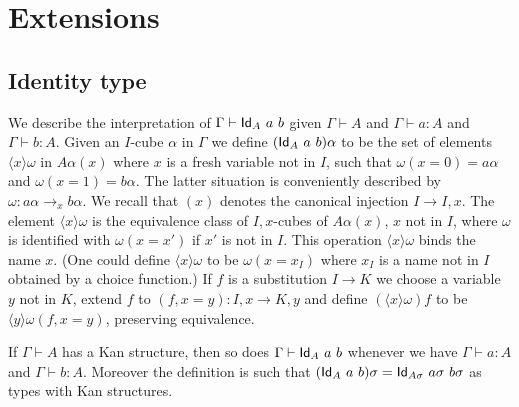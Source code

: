 \documentclass[10pt,a4paper]{article}
\makeatletter
\newcommand{\Id}{{\sf Id}}
\newcommand{\bind}[2]{{\langle}#1{\rangle}#2}
\newcommand{\napp}{\mathop{\boldsymbol{@}}}
\makeatother
\begin{document}
\section{Extensions}

\subsection{Identity type}
\label{sec:identity-type}

We describe the interpretation of $\Gamma\vdash\Id_A~a~b$ given
$\Gamma\vdash A$ and $\Gamma\vdash a:A$ and $\Gamma\vdash b:A$. Given
an $I$-cube $\alpha$ in $\Gamma$ we define $(\Id_A~a~b)\alpha$ to be
the set of elements $\bind{x}{\omega}$ in $A\alpha(x)$ where $x$ is a
fresh variable not in $I$, such that $\omega(x=0) = a\alpha$ and
$\omega(x=1) = b\alpha$. The latter situation is conveniently
described by $\omega: a\alpha\to_x b\alpha$.  We recall that $(x)$
denotes the canonical injection $I \to I,x$. The element
$\bind{x}{\omega}$ is the equivalence class of $I,x$-cubes of
$A\alpha(x)$, $x$ not in $I$, where $\omega$ is identified with
$\omega(x=x')$ if $x'$ is not in $I$. This operation
$\bind{x}{\omega}$ binds the name $x$.  (One could define
$\bind{x}{\omega}$ to be $\omega(x = x_I)$ where $x_I$ is a name not
in $I$ obtained by a choice function.) If $f$ is a substitution $I \to
K$ we choose a variable $y$ not in $K$, extend $f$ to $(f,x=y): I,x
\to K,y$ and define $(\bind{x}{\omega}) f$ to be $\bind{y}{\omega
  (f,x=y)}$, preserving equivalence.

\begin{theorem}
  If $\Gamma\vdash A$ has a Kan structure, then so does
  $\Gamma\vdash\Id_A~a~b$ whenever we have $\Gamma\vdash a:A$ and
  $\Gamma\vdash b:A$.  Moreover the definition is such that
  $(\Id_A~a~b) \sigma = \Id_{A \sigma}~a \sigma~b \sigma$ as types
  with Kan structures.
\end{theorem}
\end{document}
